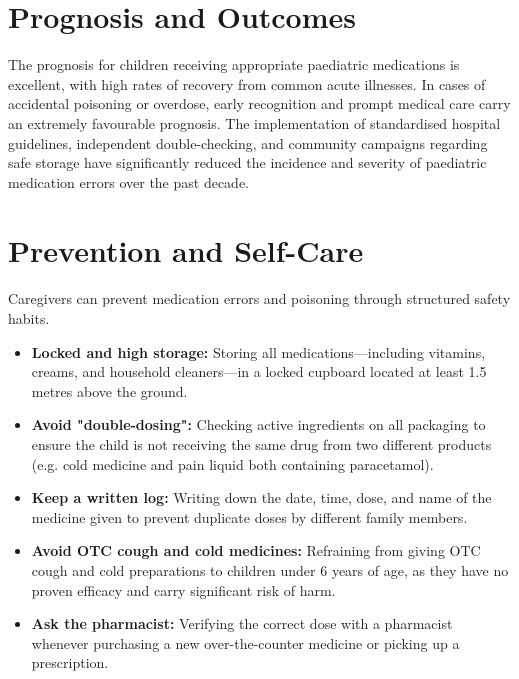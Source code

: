 \section*{Prognosis and Outcomes}
The prognosis for children receiving appropriate paediatric medications is excellent, with high rates of recovery from common acute illnesses. In cases of accidental poisoning or overdose, early recognition and prompt medical care carry an extremely favourable prognosis. The implementation of standardised hospital guidelines, independent double-checking, and community campaigns regarding safe storage have significantly reduced the incidence and severity of paediatric medication errors over the past decade.

\section*{Prevention and Self-Care}
Caregivers can prevent medication errors and poisoning through structured safety habits.
\begin{itemize}
    \item \textbf{Locked and high storage:} Storing all medications—including vitamins, creams, and household cleaners—in a locked cupboard located at least 1.5 metres above the ground.
    \item \textbf{Avoid "double-dosing":} Checking active ingredients on all packaging to ensure the child is not receiving the same drug from two different products (e.g. cold medicine and pain liquid both containing paracetamol).
    \item \textbf{Keep a written log:} Writing down the date, time, dose, and name of the medicine given to prevent duplicate doses by different family members.
    \item \textbf{Avoid OTC cough and cold medicines:} Refraining from giving OTC cough and cold preparations to children under 6 years of age, as they have no proven efficacy and carry significant risk of harm.
    \item \textbf{Ask the pharmacist:} Verifying the correct dose with a pharmacist whenever purchasing a new over-the-counter medicine or picking up a prescription.
\end{itemize}

